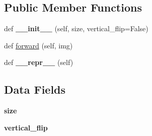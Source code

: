 \subsection*{Public Member Functions}
\begin{DoxyCompactItemize}
\item 
\mbox{\label{classtorchvision_1_1transforms_1_1transforms_1_1TenCrop_af90f7d70a7def72afe72acbf4317a844}} 
def {\bfseries \+\_\+\+\_\+init\+\_\+\+\_\+} (self, size, vertical\+\_\+flip=False)
\item 
def \hyperlink{classtorchvision_1_1transforms_1_1transforms_1_1TenCrop_a53284b367d24a1bf0e407e30eebec2f4}{forward} (self, img)
\item 
\mbox{\label{classtorchvision_1_1transforms_1_1transforms_1_1TenCrop_a7d475516f6fcf64b9a80ef7182f9b17d}} 
def {\bfseries \+\_\+\+\_\+repr\+\_\+\+\_\+} (self)
\end{DoxyCompactItemize}
\subsection*{Data Fields}
\begin{DoxyCompactItemize}
\item 
\mbox{\label{classtorchvision_1_1transforms_1_1transforms_1_1TenCrop_afc5a04d3db7a45cb18567d5dad264cc5}} 
{\bfseries size}
\item 
\mbox{\label{classtorchvision_1_1transforms_1_1transforms_1_1TenCrop_a8c6cb71846c131185d1b6367fcf619f4}} 
{\bfseries vertical\+\_\+flip}
\end{DoxyCompactItemize}



